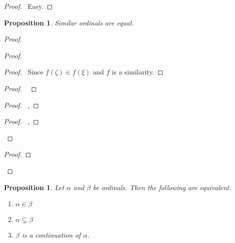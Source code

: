 \documentclass{report}
\let\qed\relax
\newtheorem{prop}[ax]{Proposition}
\theoremstyle{definition}
\begin{document}
\begin{proof}
\pf\ Easy. \qed
\end{proof}

\begin{prop}
\label{prop:similar_ordinals_equal}
Similar ordinals are equal.
\end{prop}

\begin{proof}
\pf
{}
\begin{proof}
	\begin{proof}
		\pf\ Since $f(\zeta) \in f(\xi)$ and $f$ is a similarity.
	\end{proof}
	\begin{proof}
		\pf\ 
	\end{proof}
	\begin{proof}
		\pf\ , 
	\end{proof}
	\begin{proof}
		\pf\ , 
	\end{proof}
\end{proof}
\begin{proof}
\end{proof}
\qed
\end{proof}

\begin{prop}
Let $\alpha$ and $\beta$ be ordinals. Then the following are equivalent.
\begin{enumerate}
\item $\alpha \in \beta$
\item $\alpha \subsetneq \beta$
\item $\beta$ is a continuation of $\alpha$.
\end{enumerate}
\end{prop}
\end{document}
